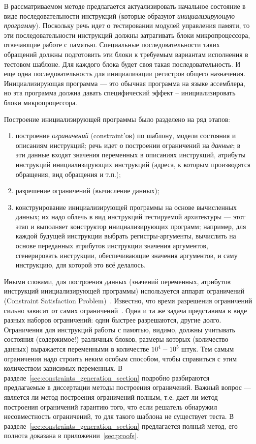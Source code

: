 В рассматриваемом методе предлагается актуализировать начальное состояние в виде
последовательности инструкций (которые образуют \emph{инициализирующую
программу}). Поскольку речь идет о тестировании модулей управления памяти, то
эти последовательности инструкций должны затрагивать блоки микропроцессора,
отвечающие работе с памятью. Специальные последовательности таких обращений
должны подготовить эти блоки к требуемым вариантам исполнения в тестовом
шаблоне. Для каждого блока будет своя такая последовательность. И еще одна
последовательность для инициализации регистров общего назначения.
Инициализирующая программа --- это обычная программа на языке ассемблера, но эта
программа должна давать специфический эффект -- инициализировать блоки
микропроцессора.

Построение инициализирующей программы было разделено на ряд этапов:
\begin{enumerate}
  \item построение \emph{ограничений} (constraint'ов) по шаблону, модели
состояния и описаниям инструкций; речь идет о построении ограничений на
\emph{данные}; в эти данные входят значения переменных в описаниях инструкций,
атрибуты инструкций инициализирующих инструкций (адреса, к которым производятся
обращения, вид обращения и т.п.);
  \item разрешение ограничений (вычисление данных);
  \item конструирование инициализирующей программы на основе вычисленных данных;
их надо облечь в вид инструкций тестируемой архитектуры --- этот этап и
выполняет конструктор инициализирующих программ; например, для каждой будущей
инструкции выбрать регистры-аргументы, вычислить на основе переданных атрибутов
инструкции значения аргументов, сгенерировать инструкции, обеспечивающие
значения аргументов, и саму инструкцию, для которой это всё делалось.
\end{enumerate}

Иными словами, для построения данных (значений переменных, атрибутов инструкций инициализирующей программы) используется аппарат ограничений (Constraint Satisfaction Problem)~\cite{CSP}. Известно, что время разрешения ограничений сильно зависит от самих ограничений~\cite{isaac05balanced}. Одна и та же задача представима в виде разных наборов ограничений: одни быстрее
разрешаются, другие долго. Ограничения для инструкций работы с памятью, видимо, должны учитывать состояния (содержимое!) различных блоков, размеры которых (количество данных) выражается переменными в количестве $10^4-10^5$ штук. Тем самым ограничения надо строить неким особым способом, чтобы справиться с этим
количеством зависимых переменных. В разделе~\ref{sec:constraints_generation_section}
подробно разбираются предлагаемые в диссертации методы построения ограничений. Важный вопрос --- является ли метод построения ограничений полным, т.е. дает ли метод построения ограничений гарантию того, что если решатель обнаружил несовместность ограничений, то для такого шаблона не существует теста. В разделе~\ref{sec:constraints_generation_section} предлагается полный метод, его полнота доказана в приложении~\ref{sec:proofs}.

